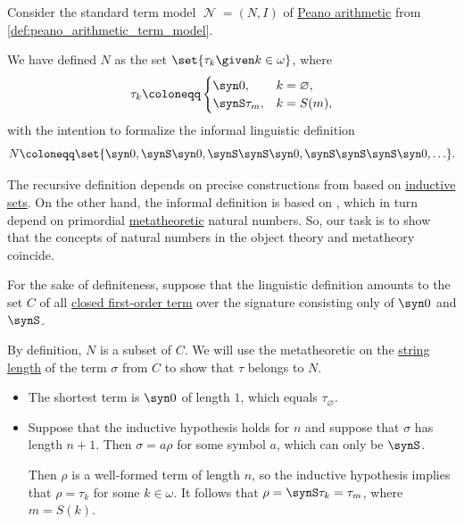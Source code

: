 \begin{remark}\label{rem:def:peano_arithmetic_term_model}
  Consider the standard term model \( \mscrN = (N, I) \) of \hyperref[def:peano_arithmetic]{Peano arithmetic} from \cref{def:peano_arithmetic_term_model}.

  We have defined \( N \) as the set \( \set{ \tau_k \given k \in \omega } \), where
  \begin{equation*}
    \tau_k \coloneqq \begin{cases}
      \syn0,        &k = \varnothing, \\
      \synS \tau_m, &k = S(m),
    \end{cases}
  \end{equation*}
  with the intention to formalize the informal linguistic definition
  \begin{equation*}
    N \coloneqq \set{ \syn0, \synS \syn0, \synS \synS \syn0, \synS \synS \synS \syn0, \ldots }.
  \end{equation*}

  The recursive definition depends on precise constructions from  based on \hyperref[def:inductive_set]{inductive sets}. On the other hand, the informal definition is based on , which in turn depend on primordial \hyperref[con:metalogic]{metatheoretic} natural numbers. So, our task is to show that the concepts of natural numbers in the object theory and metatheory coincide.

  For the sake of definiteness, suppose that the linguistic definition amounts to the set \( C \) of all \hyperref[def:fol_closed_term]{closed first-order term} over the signature consisting only of \( \syn0 \) and \( \synS \).

  By definition, \( N \) is a subset of \( C \). We will use the metatheoretic  on the \hyperref[def:formal_language/string_length]{string length} of the term \( \sigma \) from \( C \) to show that \( \tau \) belongs to \( N \).
  \begin{itemize}
    \item The shortest term is \( \syn0 \) of length \( 1 \), which equals \( \tau_\varnothing \).

    \item Suppose that the inductive hypothesis holds for \( n \) and suppose that \( \sigma \) has length \( n + 1 \). Then \( \sigma = a \rho \) for some symbol \( a \), which can only be \( \synS \).

    Then \( \rho \) is a well-formed term of length \( n \), so the inductive hypothesis implies that \( \rho = \tau_k \) for some \( k \in \omega \). It follows that \( \rho = \synS \tau_k = \tau_m \), where \( m = S(k) \).
  \end{itemize}
\end{remark}

